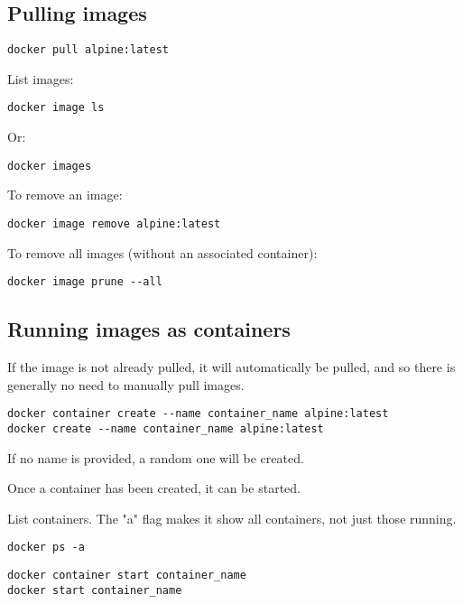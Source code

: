 
\subsection{Pulling images}

\begin{verbatim}
docker pull alpine:latest
\end{verbatim}


List images:
\begin{verbatim}
docker image ls
\end{verbatim}

Or:

\begin{verbatim}
docker images
\end{verbatim}


To remove an image:
\begin{verbatim}
docker image remove alpine:latest
\end{verbatim}

To remove all images (without an associated container):

\begin{verbatim}
docker image prune --all
\end{verbatim}


\subsection{Running images as containers}

If the image is not already pulled, it will automatically be pulled, and so there is generally no need to manually pull images.

\begin{verbatim}
docker container create --name container_name alpine:latest
docker create --name container_name alpine:latest
\end{verbatim}

If no name is provided, a random one will be created.

Once a container has been created, it can be started.

List containers. The "a" flag makes it show all containers, not just those running.
\begin{verbatim}
docker ps -a
\end{verbatim}

\begin{verbatim}
docker container start container_name
docker start container_name
\end{verbatim}

